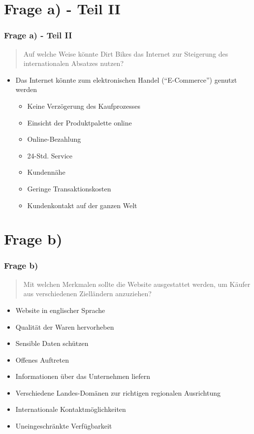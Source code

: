 \documentclass{beamer}
\begin{document}
\section{Frage a) - Teil II}
\begin{frame}
\frametitle{Frage a) - Teil II}

\begin{quote}
Auf welche Weise k\"onnte Dirt Bikes das Internet zur Steigerung des internationalen Absatzes nutzen?
\end{quote}

\begin{itemize}
\item Das Internet k\"onnte zum elektronischen Handel (``E-Commerce'') genutzt werden
\begin{itemize}
\setlength{\itemsep}{8pt}
\item Keine Verz\"ogerung des Kaufprozesses
\item Einsicht der Produktpalette online
\item Online-Bezahlung
\item 24-Std. Service
\item Kundenn\"ahe
\item Geringe Transaktionskosten
\item Kundenkontakt auf der ganzen Welt
\end{itemize}
\end{itemize}

\end{frame}

\section{Frage b)}
\begin{frame}
\frametitle{Frage b)}

\begin{quote}
Mit welchen Merkmalen sollte die Website ausgestattet werden, um Käufer aus verschiedenen Zielländern anzuziehen?
\end{quote}

\begin{itemize}
\setlength{\itemsep}{6pt}
\item Website in englischer Sprache
\item Qualit\"at der Waren hervorheben
\item Sensible Daten sch\"utzen
\item Offenes Auftreten
\item Informationen \"uber das Unternehmen liefern
\item Verschiedene Landes-Dom\"anen  zur richtigen regionalen Ausrichtung
\item Internationale Kontaktm\"oglichkeiten
\item Uneingeschr\"ankte Verf\"ugbarkeit
\end{itemize}

\end{frame}
\end{document}
